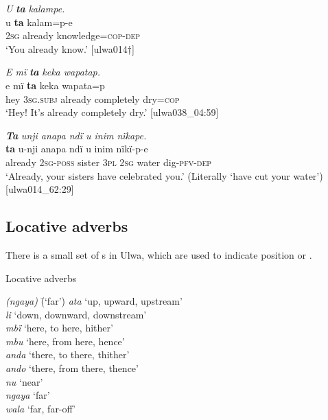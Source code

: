 
\ea%
    \label{ex:otherwc:69}
          \textit{U} \textbf{\textit{ta}} \textit{kalampe.}\\
\gll    u    \textbf{ta}    kalam=p-e\\
    2\textsc{sg}  already  knowledge=\textsc{cop-dep}\\
\glt `You already know.’ [ulwa014†]
\z

\ea%
    \label{ex:otherwc:70}
          \textit{E mï} \textbf{\textit{ta}} \textit{keka wapatap.}\\
\gll    e  mï      \textbf{ta}    keka      wapata=p\\
    hey  3\textsc{sg.subj}  already  completely  dry=\textsc{cop}\\
\glt `Hey! It’s already completely dry.’ [ulwa038\_04:59]
\z

\ea%
    \label{ex:otherwc:71}
          \textbf{\textit{Ta}} \textit{unji anapa ndï u inim nïkape.}\\
\gll    \textbf{ta}    u-nji    anapa  ndï  u    inim  nïkï-p-e\\
    already  2\textsc{sg-poss}  sister  \textsc{3pl}  2\textsc{sg}  water  dig{}-\textsc{pfv-dep}\\
\glt `Already, your sisters have celebrated you.’ (Literally ‘have cut your water’) [ulwa014\_62:29]
\z

\subsection{Locative adverbs}\label{sec:8.2.2}


There is a small set of s in Ulwa, which are used to indicate position or  .

\ea%
    \label{ex:otherwc:72}
          Locative adverbs
\begin{tabbing}
{\textit{(ngaya)}}  \=  {(‘far’)}\kill
{\textit{ata}}    \>  {‘up, upward, upstream’}\\
{\textit{li}}  \>    {‘down, downward, downstream’}\\
{\textit{mbï}}  \>  {‘here, to here, hither’}\\
{\textit{mbu}}  \>  {‘here, from here, hence’}\\
{\textit{anda}}  \>  {‘there, to there, thither’}\\
{\textit{ando}} \>   {‘there, from there, thence’}\\
{\textit{nu}}  \>    {‘near’}\\
{\textit{ngaya}}  \>  {‘far’}\\
{\textit{wala}} \>   {‘far, far-off’}
\end{tabbing}
\z

